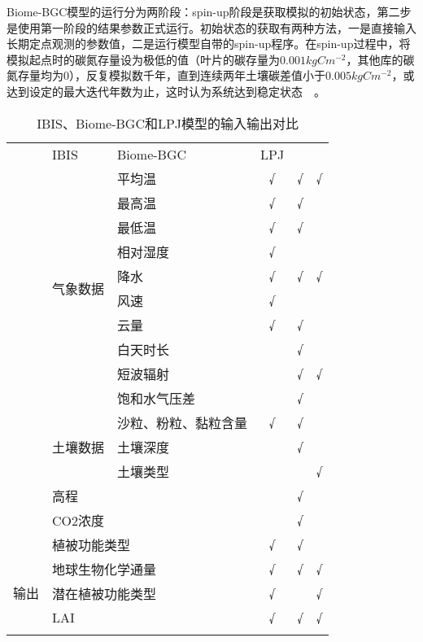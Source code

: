 Biome-BGC模型的运行分为两阶段：spin-up阶段是获取模拟的初始状态，第二步是使用第一阶段的结果参数正式运行。初始状态的获取有两种方法，一是直接输入长期定点观测的参数值，二是运行模型自带的spin-up程序。在spin-up过程中，将模拟起点时的碳氮存量设为极低的值（叶片的碳存量为$0.001kgC m^{-2}$，其他库的碳氮存量均为0），反复模拟数千年，直到连续两年土壤碳差值小于$0.005kgC m^{-2}$，或达到设定的最大迭代年数为止，这时认为系统达到稳定状态~\cite{thornton2005ecosystem}~\cite{pietsch2005bgc}。

\begin{table}[H]
    \centering
    \caption{IBIS、Biome-BGC和LPJ模型的输入输出对比}
    \label{tab:model-io-cmp}
    \begin{threeparttable}
        \begin{tabular}{l|l|l|ccc}
            \Xhline{1.5pt}
            \multicolumn{3}{c|}{数据} & IBIS & Biome-BGC & LPJ \\
            \Xhline{1.5pt}
            \multirow{15}{*}{输入} & \multirow{10}{*}{气象数据} & 平均温 & √ & √ & √ \\
            & & 最高温 & √ & √ & \\
            & & 最低温 & √ & √ & \\
            & & 相对湿度 & √ & & \\
            & & 降水 & √ & √ & √ \\
            & & 风速 & √ & & \\
            & & 云量 & √ & √ & \\
            & & 白天时长 & & √ & \\
            & & 短波辐射 & & √ & √ \\
            & & 饱和水气压差 & & √ & \\
            \cline{2-6}
            & \multirow{3}{*}{土壤数据} & 沙粒、粉粒、黏粒含量 & √ & √ & \\
            & & 土壤深度 & & √ &  \\
            & & 土壤类型 & & & √ \\
            \cline{2-6}
            & \multicolumn{2}{l|}{高程} & & √ & \\
            \cline{2-6}
            & \multicolumn{2}{l|}{CO2浓度} & & √ & \\
            \cline{2-6}
            & \multicolumn{2}{l|}{植被功能类型} & √ & √ & \\
            \hline
            \multirow{3}{*}{输出} & \multicolumn{2}{l|}{地球生物化学通量} & √ & √ & √ \\
            & \multicolumn{2}{l|}{潜在植被功能类型} & √ & & √ \\
            & \multicolumn{2}{l|}{LAI} & √ & √ & √ \\
            \Xhline{1.5pt}
        \end{tabular}
    \end{threeparttable}
\end{table}

